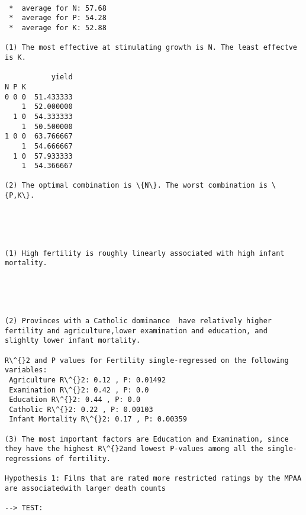 \documentclass[11pt]{article}
\begin{document}
    \begin{Verbatim}[commandchars=\\\{\}]

 *  average for N: 57.68 
 *  average for P: 54.28 
 *  average for K: 52.88 

(1) The most effective at stimulating growth is N. The least effectve is K.

           yield
N P K           
0 0 0  51.433333
    1  52.000000
  1 0  54.333333
    1  50.500000
1 0 0  63.766667
    1  54.666667
  1 0  57.933333
    1  54.366667

(2) The optimal combination is \{N\}. The worst combination is \{P,K\}.


    \end{Verbatim}

    \begin{center}
    \end{center}
    { \hspace*{\fill} \\}
    
    \begin{Verbatim}[commandchars=\\\{\}]

(1) High fertility is roughly linearly associated with high infant mortality.


    \end{Verbatim}

    \begin{center}
    \end{center}
    { \hspace*{\fill} \\}
    
    \begin{Verbatim}[commandchars=\\\{\}]

(2) Provinces with a Catholic dominance  have relatively higher fertility and agriculture,lower examination and education, and slighlty lower infant mortality. 

R\^{}2 and P values for Fertility single-regressed on the following variables:
 Agriculture R\^{}2: 0.12 , P: 0.01492 
 Examination R\^{}2: 0.42 , P: 0.0 
 Education R\^{}2: 0.44 , P: 0.0 
 Catholic R\^{}2: 0.22 , P: 0.00103 
 Infant Mortality R\^{}2: 0.17 , P: 0.00359

(3) The most important factors are Education and Examination, since they have the highest R\^{}2and lowest P-values among all the single-regressions of fertility.

Hypothesis 1: Films that are rated more restricted ratings by the MPAA are associatedwith larger death counts

--> TEST:

    \end{Verbatim}
\end{document}
